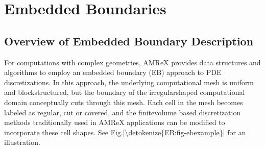 \documentclass[letterpaper,10pt,english]{sphinxmanual}
\begin{document}
\begin{sphinxVerbatim}[commandchars=\\\{\}]
  
     
   
  
     
     
     
       
     
\end{sphinxVerbatim}


\chapter{Embedded Boundaries}
\label{\detokenize{EB_Chapter:embedded-boundaries}}\label{\detokenize{EB_Chapter:chap-eb}}\label{\detokenize{EB_Chapter::doc}}

\section{Overview of Embedded Boundary Description}
\label{\detokenize{EB:overview-of-embedded-boundary-description}}\label{\detokenize{EB:sec-eb-eboverview}}\label{\detokenize{EB::doc}}
\sphinxAtStartPar
For computations with complex geometries, AMReX provides data structures and
algorithms to employ an embedded boundary (EB) approach to PDE discretizations.
In this approach, the underlying computational mesh is uniform and
block\sphinxhyphen{}structured, but the boundary of the irregular\sphinxhyphen{}shaped computational domain
conceptually cuts through this mesh. Each cell in the mesh becomes labeled as
regular, cut or covered, and the finite\sphinxhyphen{}volume based discretization methods
traditionally used in AMReX applications can be modified to incorporate these
cell shapes. See \hyperref[\detokenize{EB:fig-ebexample}]{Fig.\@ \ref{\detokenize{EB:fig-ebexample}}} for an illustration.
\end{document}
